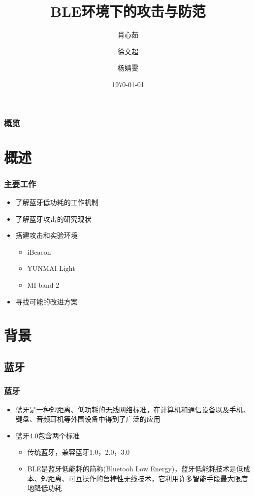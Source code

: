 \documentclass[UTF8]{ctexbeamer}
\title[BLE Security]{BLE环境下的攻击与防范}
\author{肖心茹 \and 徐文超 \and 杨婧雯}
\institute[DLUT]
{
大连理工大学软件学院 \\ 
\url{https://github.com/knowncold/BLE_Security}
}
\date{\today}
\begin{document}
\begin{frame}
\titlepage
\end{frame}

\begin{frame}
\frametitle{概览} %
\tableofcontents
\end{frame}


\section{概述}

\begin{frame}
  \frametitle{主要工作}
  \begin{itemize}
    \item 了解蓝牙低功耗的工作机制
    \item 了解蓝牙攻击的研究现状
    \item 搭建攻击和实验环境
      \begin{itemize}
      \item iBeacon
      \item YUNMAI Light
      \item MI band 2
      \end{itemize}
    \item 寻找可能的改进方案
  \end{itemize}
\end{frame}

\section{背景}
\subsection{蓝牙}
\begin{frame}
	\frametitle{蓝牙}
	\begin{itemize}
	\item 蓝牙是一种短距离、低功耗的无线网络标准，在计算机和通信设备以及手机、键盘、音频耳机等外围设备中得到了广泛的应用
	\item 蓝牙4.0包含两个标准
		\begin{itemize}
				\item 传统蓝牙，兼容蓝牙1.0，2.0，3.0
				\item BLE是蓝牙低能耗的简称(Bluetooh Low Energy)，蓝牙低能耗技术是低成本、短距离、可互操作的鲁棒性无线技术，它利用许多智能手段最大限度地降低功耗
		\end{itemize}
	\end{itemize}
\end{frame}
\end{document}
